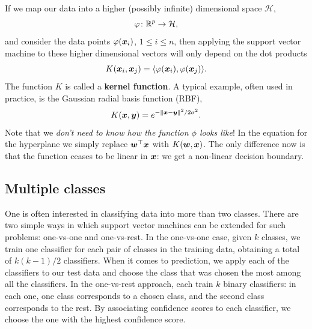 If we map our data into a higher (possibly infinite) dimensional space $\mathcal{H}$,
\begin{equation*}
  \varphi\colon \mathbb{R}^p \to \mathcal{H},
\end{equation*}
and consider the data points $\varphi(\bm{x}_i)$, $1\leq i\leq n$, then applying the support vector machine to these higher dimensional vectors will only depend on the dot products 
\begin{equation*}
K(\bm{x}_i,\bm{x}_j) = \langle {\varphi(\bm{x}_i)}, {\varphi(\bm{x}_j)} \rangle.
\end{equation*}
The function $K$ is called a \textbf{kernel function}. A typical example, often used in practice, is the Gaussian radial basis function (RBF),
\begin{equation*}
  K(\bm{x},\bm{y}) = e^{-\Vert {\bm{x}-\bm{y}}\Vert^2/2\sigma^2}.
\end{equation*}
Note that we {\em don't need to know how the function $\phi$ looks like}! In the equation for the hyperplane we simply replace $\bm{w}^{\top}\bm{x}$ with $K(\bm{w},\bm{x})$. The only difference now is that the function ceases to be linear in $\bm{x}$: we get a non-linear decision boundary.

\subsection{Multiple classes}
One is often interested in classifying data into more than two classes. There are two simple ways in which support vector machines can be extended for such problems: one-vs-one and one-vs-rest. In the one-vs-one case, given $k$ classes, we train one classifier for each pair of classes in the training data, obtaining a total of $k(k-1)/2$ classifiers. When it comes to prediction, we apply each of the classifiers to our test data and choose the class that was chosen the most among all the classifiers. In the one-vs-rest approach, each train $k$ binary classifiers: in each one, one class corresponds to a chosen class, and the second class corresponds to the rest. By associating confidence scores to each classifier, we choose the one with the highest confidence score.

